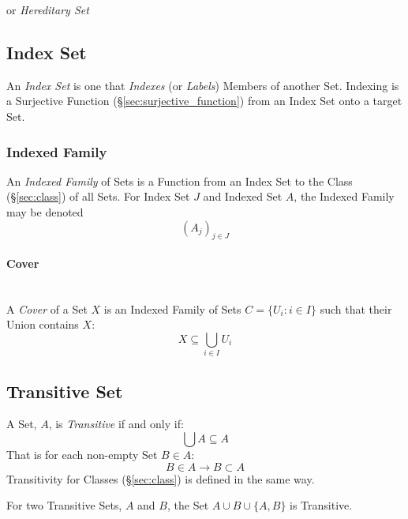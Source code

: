 or \emph{Hereditary Set}



\subsection{Index Set}\label{sec:index_set}

An \emph{Index Set} is one that \emph{Indexes} (or \emph{Labels})
Members of another Set. Indexing is a Surjective Function
(\S\ref{sec:surjective_function}) from an Index Set onto a target Set.



\subsubsection{Indexed Family}\label{sec:indexed_family}

An \emph{Indexed Family} of Sets is a Function from an Index Set to
the Class (\S\ref{sec:class}) of all Sets. For Index Set $J$ and
Indexed Set $A$, the Indexed Family may be denoted
\[
  (A_j)_{j \in J}
\]



\paragraph{Cover}\label{sec:cover}
\hfill \\

A \emph{Cover} of a Set $X$ is an Indexed Family of Sets $C = \{ U_i :
i \in I \}$ such that their Union contains $X$:
\[
  X \subseteq \bigcup_{i \in I} U_i
\]



\subsection{Transitive Set}\label{sec:transitive_set}

A Set, $A$, is \emph{Transitive} if and only if:
\[
  \bigcup A \subseteq A
\]
That is for each non-empty Set $B \in A$:
\[
  B \in A \rightarrow B \subset A
\]
Transitivity for Classes (\S\ref{sec:class}) is defined in the same
way.

For two Transitive Sets, $A$ and $B$, the Set $A \cup B \cup \{A,B\}$
is Transitive.

